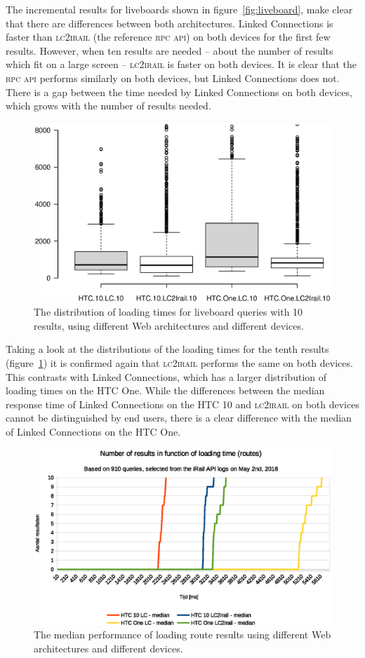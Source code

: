 \documentclass[twocolumn]{phdsymp} %
\begin{document}
The incremental results for liveboards shown in figure~\ref{fig:liveboard}, make clear that there are differences between both architectures. Linked Connections is faster than \textsc{lc2irail} (the reference \textsc{rpc} \textsc{api}) on both devices for the first few results. However, when ten results are needed – about the number of results which fit on a large screen – \textsc{lc2irail} is faster on both devices. It is clear that the \textsc{rpc} \textsc{api} performs similarly on both devices, but Linked Connections does not. There is a gap between the time needed by Linked Connections on both devices, which grows with the number of results needed.

\begin{figure}[ht]
	\begin{center}
		\includegraphics[trim=3cm 4cm 0 0, width=.50\textwidth]{images/boxplot_liveboards_10.eps}
		\caption{\label{fig:liveboardboxplot} The distribution of loading times for liveboard queries with 10 results, using different Web architectures and different devices. }
	\end{center}
\end{figure}

Taking a look at the distributions of the loading times for the tenth results (figure~\ref{fig:liveboardboxplot}) it is confirmed again that \textsc{lc2irail} performs the same on both devices. This contrasts with Linked Connections, which has a larger distribution of loading times on the HTC One. While the differences between the median response time of Linked Connections on the HTC 10 and \textsc{lc2irail} on both devices cannot be distinguished by end users, there is a clear difference with the median of Linked Connections on the HTC One.

\begin{figure}[ht]
	\begin{center}
		\includegraphics[width=.50\textwidth]{images/dief_routes_average.eps}
		\caption{\label{fig:route} The median performance of loading route results using different Web architectures and different devices.}
	\end{center}
\end{figure}
\end{document}
